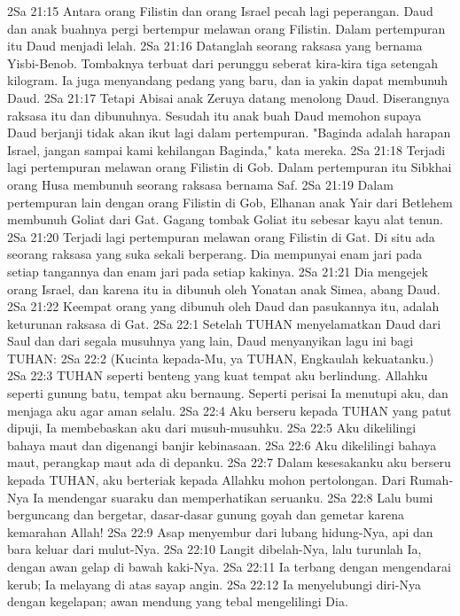 2Sa 21:15  Antara orang Filistin dan orang Israel pecah lagi peperangan. Daud dan anak buahnya pergi bertempur melawan orang Filistin. Dalam pertempuran itu Daud menjadi lelah.
2Sa 21:16  Datanglah seorang raksasa yang bernama Yisbi-Benob. Tombaknya terbuat dari perunggu seberat kira-kira tiga setengah kilogram. Ia juga menyandang pedang yang baru, dan ia yakin dapat membunuh Daud.
2Sa 21:17  Tetapi Abisai anak Zeruya datang menolong Daud. Diserangnya raksasa itu dan dibunuhnya. Sesudah itu anak buah Daud memohon supaya Daud berjanji tidak akan ikut lagi dalam pertempuran. "Baginda adalah harapan Israel, jangan sampai kami kehilangan Baginda," kata mereka.
2Sa 21:18  Terjadi lagi pertempuran melawan orang Filistin di Gob. Dalam pertempuran itu Sibkhai orang Husa membunuh seorang raksasa bernama Saf.
2Sa 21:19  Dalam pertempuran lain dengan orang Filistin di Gob, Elhanan anak Yair dari Betlehem membunuh Goliat dari Gat. Gagang tombak Goliat itu sebesar kayu alat tenun.
2Sa 21:20  Terjadi lagi pertempuran melawan orang Filistin di Gat. Di situ ada seorang raksasa yang suka sekali berperang. Dia mempunyai enam jari pada setiap tangannya dan enam jari pada setiap kakinya.
2Sa 21:21  Dia mengejek orang Israel, dan karena itu ia dibunuh oleh Yonatan anak Simea, abang Daud.
2Sa 21:22  Keempat orang yang dibunuh oleh Daud dan pasukannya itu, adalah keturunan raksasa di Gat.
2Sa 22:1  Setelah TUHAN menyelamatkan Daud dari Saul dan dari segala musuhnya yang lain, Daud menyanyikan lagu ini bagi TUHAN:
2Sa 22:2  (Kucinta kepada-Mu, ya TUHAN, Engkaulah kekuatanku.)
2Sa 22:3  TUHAN seperti benteng yang kuat tempat aku berlindung. Allahku seperti gunung batu, tempat aku bernaung. Seperti perisai Ia menutupi aku, dan menjaga aku agar aman selalu.
2Sa 22:4  Aku berseru kepada TUHAN yang patut dipuji, Ia membebaskan aku dari musuh-musuhku.
2Sa 22:5  Aku dikelilingi bahaya maut dan digenangi banjir kebinasaan.
2Sa 22:6  Aku dikelilingi bahaya maut, perangkap maut ada di depanku.
2Sa 22:7  Dalam kesesakanku aku berseru kepada TUHAN, aku berteriak kepada Allahku mohon pertolongan. Dari Rumah-Nya Ia mendengar suaraku dan memperhatikan seruanku.
2Sa 22:8  Lalu bumi berguncang dan bergetar, dasar-dasar gunung goyah dan gemetar karena kemarahan Allah!
2Sa 22:9  Asap menyembur dari lubang hidung-Nya, api dan bara keluar dari mulut-Nya.
2Sa 22:10  Langit dibelah-Nya, lalu turunlah Ia, dengan awan gelap di bawah kaki-Nya.
2Sa 22:11  Ia terbang dengan mengendarai kerub; Ia melayang di atas sayap angin.
2Sa 22:12  Ia menyelubungi diri-Nya dengan kegelapan; awan mendung yang tebal mengelilingi Dia.
